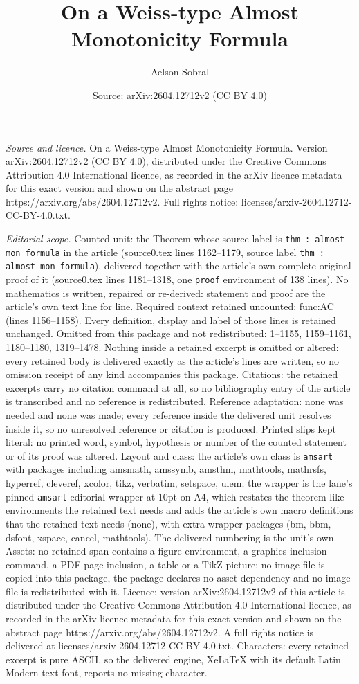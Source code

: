 \documentclass[10pt,a4paper]{amsart}
\title[On a Weiss-type Almost Monotonicity Formula]{On a Weiss-type Almost Monotonicity Formula}
\author{Aelson Sobral}
\date{Source: arXiv:2604.12712v2 (CC BY 4.0)}
\begin{document}
\maketitle

\noindent\emph{Source and licence.} On a Weiss-type Almost Monotonicity Formula. Version arXiv:2604.12712v2 (CC BY 4.0), distributed under the Creative Commons Attribution 4.0 International licence, as recorded in the arXiv licence metadata for this exact version and shown on the abstract page https://arxiv.org/abs/2604.12712v2. Full rights notice: licenses/arxiv-2604.12712-CC-BY-4.0.txt.\par\smallskip

\noindent\textit{Editorial scope.} Counted unit: the Theorem whose source label is \texttt{thm : almost mon formula} in the article (source0.tex lines 1162--1179, source label \texttt{thm : almost mon formula}), delivered together with the article's own complete original proof of it (source0.tex lines 1181--1318, one \texttt{proof} environment of 138 lines). No mathematics is written, repaired or re-derived: statement and proof are the article's own text line for line. Required context retained uncounted: func:AC (lines 1156--1158). Every definition, display and label of those lines is retained unchanged. Omitted from this package and not redistributed: 1--1155, 1159--1161, 1180--1180, 1319--1478. Nothing inside a retained excerpt is omitted or altered: every retained body is delivered exactly as the article's lines are written, so no omission receipt of any kind accompanies this package. Citations: the retained excerpts carry no citation command at all, so no bibliography entry of the article is transcribed and no reference is redistributed. Reference adaptation: none was needed and none was made; every reference inside the delivered unit resolves inside it, so no unresolved reference or citation is produced. Printed slips kept literal: no printed word, symbol, hypothesis or number of the counted statement or of its proof was altered. Layout and class: the article's own class is \texttt{amsart} with packages including amsmath, amssymb, amsthm, mathtools, mathrsfs, hyperref, cleveref, xcolor, tikz, verbatim, setspace, ulem; the wrapper is the lane's pinned \texttt{amsart} editorial wrapper at 10pt on A4, which restates the theorem-like environments the retained text needs and adds the article's own macro definitions that the retained text needs (none), with extra wrapper packages (bm, bbm, dsfont, xspace, cancel, mathtools). The delivered numbering is the unit's own. Assets: no retained span contains a figure environment, a graphics-inclusion command, a PDF-page inclusion, a table or a TikZ picture; no image file is copied into this package, the package declares no asset dependency and no image file is redistributed with it. Licence: version arXiv:2604.12712v2 of this article is distributed under the Creative Commons Attribution 4.0 International licence, as recorded in the arXiv licence metadata for this exact version and shown on the abstract page https://arxiv.org/abs/2604.12712v2. A full rights notice is delivered at licenses/arxiv-2604.12712-CC-BY-4.0.txt. Characters: every retained excerpt is pure ASCII, so the delivered engine, XeLaTeX with its default Latin Modern text font, reports no missing character.
\end{document}
